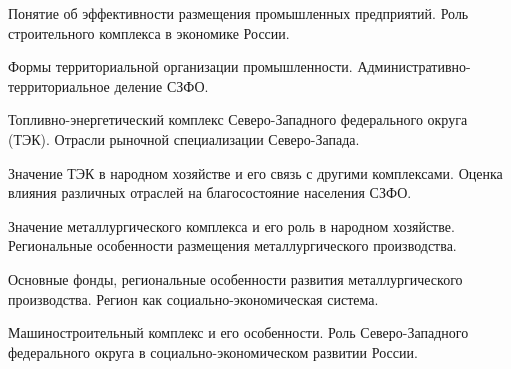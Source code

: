 \documentclass[
	14pt,
	a4paper,
	]
	{scrartcl}
\begin{document}
\shapk
{}
\setcounter{zad}{0}

\vfill
\z Понятие об эффективности размещения промышленных предприятий.
 \vfill
\z Роль строительного комплекса в экономике России.
 \vfill

\vfill

\newpage


\shapk
{}
\setcounter{zad}{0}

\vfill
\z Формы территориальной организации промышленности.
 \vfill
\z Административно-территориальное деление СЗФО.
 \vfill

\vfill

\newpage


\shapk
{}
\setcounter{zad}{0}

\vfill
\z Топливно-энергетический комплекс Северо-Западного федерального округа (ТЭК).
 \vfill
\z Отрасли рыночной специализации Северо-Запада.
 \vfill

\vfill

\newpage


\shapk
{}
\setcounter{zad}{0}

\vfill
\z Значение ТЭК в народном хозяйстве и его связь с другими комплексами.
 \vfill
\z Оценка влияния различных отраслей на благосостояние населения СЗФО.
 \vfill

\vfill

\newpage


\shapk
{}
\setcounter{zad}{0}

\vfill
\z Значение металлургического комплекса и его роль в народном хозяйстве.
 \vfill
\z Региональные особенности размещения металлургического производства.
 \vfill

\vfill

\newpage


\shapk
{}
\setcounter{zad}{0}

\vfill
\z Основные фонды, региональные особенности развития металлургического производства.
 \vfill
\z Регион как социально-экономическая система.
 \vfill

\vfill

\newpage


\shapk
{}
\setcounter{zad}{0}

\vfill
\z Машиностроительный комплекс и его особенности.
 \vfill
\z Роль Северо-Западного федерального округа в социально-экономическом развитии России.
 \vfill
\end{document}
